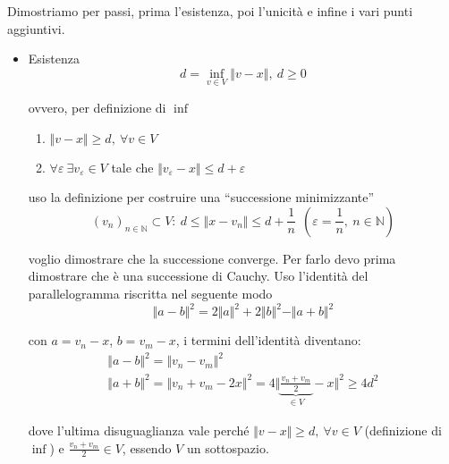 \documentclass[10pt,a4paper,twoside,openright]{book}
\begin{document}
\begin{dimostrazione}
	Dimostriamo per passi, prima l'esistenza, poi l'unicità e infine i vari punti aggiuntivi.
	\begin{itemize}
		\item Esistenza\begin{equation*}
		      d=\inf_{v\in V}\Vert v-x\Vert,\ d\geqslant 0
		\end{equation*}
		
		ovvero, per definizione di $\displaystyle \inf$
		\begin{enumerate}
			\item $\displaystyle \Vert v-x\Vert \geqslant d,\ \forall v\in V$
			\item $\displaystyle \forall \varepsilon \ \exists v_{\varepsilon } \in V$ tale che $\displaystyle \Vert v_{\varepsilon } -x\Vert \leqslant d+\varepsilon $ \ $ $
		\end{enumerate}
		
		uso la definizione per costruire una ``successione minimizzante''
		\begin{equation}
			(v_{n})_{n\in \mathbb{N}} \subset V:\ d\leqslant \Vert x-v_{n}\Vert \leqslant d+\frac{1}{n} \ \ \left( \varepsilon =\frac{1}{n},\ n\in \mathbb{N}\right)
			\label{eq:teo-proiez-suc-min}
		\end{equation}
		
		voglio dimostrare che la successione converge. Per farlo devo prima dimostrare che è una successione di Cauchy. Uso l'identità del parallelogramma riscritta nel seguente modo\begin{equation*}
		\Vert a-b\Vert ^{2} =2\Vert a\Vert ^{2} +2\Vert b\Vert ^{2} -\Vert a+b\Vert ^{2}
		\end{equation*}
		
		con $\displaystyle a=v_{n} -x$, $\displaystyle b=v_{m} -x$, i termini dell'identità diventano:\begin{equation*}
		\begin{array}{ l }
			\Vert a-b\Vert ^{2} =\Vert v_{n} -v_{m}\Vert ^{2}                                                                                                 \\
			\Vert a+b\Vert ^{2} =\Vert v_{n} +v_{m} -2x\Vert ^{2} =4\bigg\Vert \underbrace{\frac{v_{n} +v_{m}}{2}}_{\in V} -x\bigg\Vert ^{2} \geqslant 4d^{2} 
		\end{array}
		\end{equation*}
		
		dove l'ultima disuguaglianza vale perché $\Vert v-x\Vert \geqslant d,\ \forall v\in V$ (definizione di $\inf$) e $\displaystyle \frac{v_{n} +v_{m}}{2} \in V$, essendo $V$ un sottospazio.
		

\end{itemize}
\end{dimostrazione}
\end{document}
